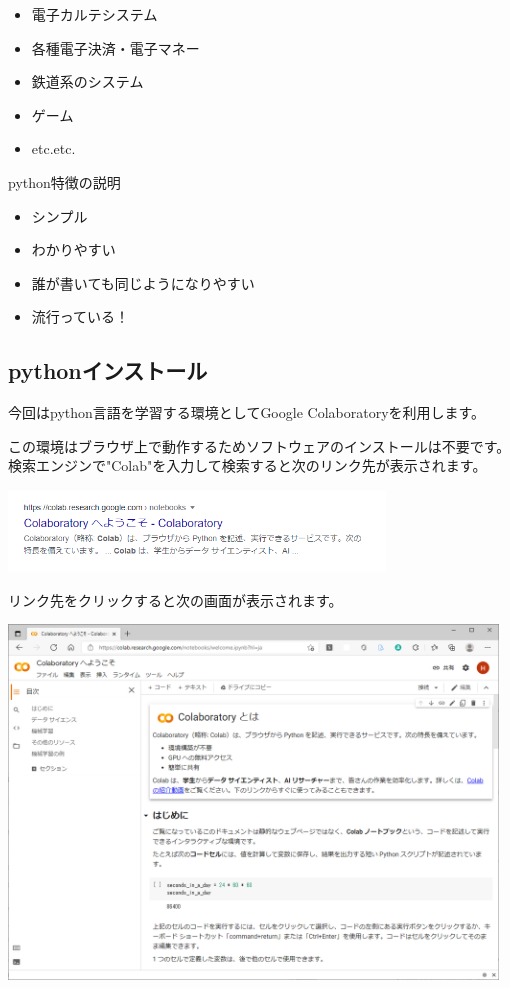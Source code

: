 \documentclass[11pt,a4paper,dvipdfmx,titlepage]{jsreport}
\begin{document}
\begin{itemize}
 \item 電子カルテシステム 
 \item 各種電子決済・電子マネー
 \item 鉄道系のシステム
 \item ゲーム
 \item etc.etc.
\end{itemize}

python特徴の説明
\begin{itemize}
 \item シンプル
 \item わかりやすい
 \item 誰が書いても同じようになりやすい
 \item 流行っている！
\end{itemize}

\subsection{pythonインストール}
今回はpython言語を学習する環境としてGoogle Colaboratoryを利用します。

この環境はブラウザ上で動作するためソフトウェアのインストールは不要です。
\newpage
検索エンジンで"Colab"を入力して検索すると次のリンク先が表示されます。


\includegraphics[width=10cm]{images/colab01.png}

リンク先をクリックすると次の画面が表示されます。

\includegraphics[width=13cm]{images/colab02.png}
\end{document}
